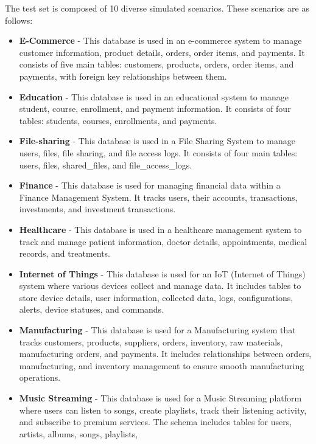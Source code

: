 The test set is composed of 10 diverse simulated scenarios. These scenarios are as follows:

\begin{itemize}
    \item \textbf{E-Commerce} - This database is used in an e-commerce system to manage customer information,
    product details, orders, order items, and payments. It consists of five main tables:
    customers, products, orders, order items, and payments, with foreign key relationships
    between them.
    \item \textbf{Education} - This database is used in an educational system to manage student, course,
    enrollment, and payment information. It consists of four tables: students, courses,
    enrollments, and payments.
    \item \textbf{File-sharing} - This database is used in a File Sharing System to manage users, files,
    file sharing, and file access logs. It consists of four main tables: users, files,
    shared\_files, and file\_access\_logs.
    \item \textbf{Finance} - This database is used for managing financial data within a Finance Management
    System. It tracks users, their accounts, transactions, investments, and investment
    transactions.
    \item \textbf{Healthcare} - This database is used in a healthcare management system to track and manage
    patient information, doctor details, appointments, medical records, and treatments.
    \item \textbf{Internet of Things} - This database is used for an IoT (Internet of Things) system where various
    devices collect and manage data. It includes tables to store device details, user
    information, collected data, logs, configurations, alerts, device statuses, and
    commands.
    \item \textbf{Manufacturing} - This database is used for a Manufacturing system that tracks customers,
    products, suppliers, orders, inventory, raw materials, manufacturing orders, and
    payments. It includes relationships between orders, manufacturing, and inventory
    management to ensure smooth manufacturing operations.
    \item \textbf{Music Streaming} - This database is used for a Music Streaming platform where users can listen
    to songs, create playlists, track their listening activity, and subscribe to premium
    services. The schema includes tables for users, artists, albums, songs, playlists,

\end{itemize}
